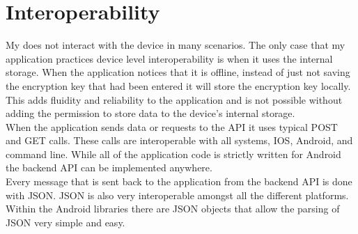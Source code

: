 \documentclass[letterpaper,12pt,notitlepage,fleqn]{article}
\begin{document}
\section{Interoperability}
\indent My does not interact with the device in many scenarios. The only case that my application practices device level interoperability is when it uses the internal storage. When the application notices that it is offline, instead of just not saving the encryption key that had been entered it will store the encryption key locally. This adds fluidity and reliability to the application and is not possible without adding the permission to store data to the device's internal storage. 
\\
\indent When the application sends data or requests to the API it uses typical POST and GET calls. These calls are interoperable with all systems, IOS, Android, and command line. While all of the application code is strictly written for Android the backend API can be implemented anywhere.
\\
\indent Every message that is sent back to the application from the backend API is done with JSON. JSON is also very interoperable amongst all the different platforms. Within the Android libraries there are JSON objects that allow the parsing of JSON very simple and easy. 
\end{document}
